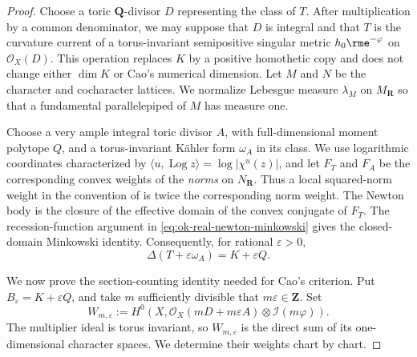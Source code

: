 \begin{proof}
Choose a toric $\mathbf Q$-divisor $D$ representing the class of $T$.
After multiplication by a common denominator, we may suppose that $D$ is
integral and that $T$ is the curvature current of a torus-invariant
semipositive singular metric $h_0\rme^{-\varphi}$ on
$\mathcal O_X(D)$.  This operation replaces $K$ by a positive homothetic
copy and does not change either $\dim K$ or Cao's numerical dimension.  Let
$M$ and $N$ be the character and cocharacter lattices.  We normalize
Lebesgue measure $\lambda_M$ on $M_{\mathbf R}$ so that a fundamental
parallelepiped of $M$ has measure one.

Choose a very ample integral toric divisor $A$, with full-dimensional
moment polytope $Q$, and a torus-invariant K\"ahler form $\omega_A$ in
its class.  We use logarithmic coordinates characterized by
$\langle u,\operatorname{Log}z\rangle=\log|\chi^u(z)|$, and let
$F_T$ and $F_A$
be the corresponding convex weights of the \emph{norms} on
$N_{\mathbf R}$.  Thus a local squared-norm weight in the convention of
 is twice the corresponding norm weight.  The
Newton body is the closure of the effective domain of the convex conjugate
of $F_T$.  The recession-function argument in
\eqref{eq:ok-real-newton-minkowski} gives the closed-domain Minkowski
identity.  Consequently, for rational $\varepsilon>0$,
\[
                  \Delta(T+\varepsilon\omega_A)=K+\varepsilon Q.
\tag{55.60}\label{eq:ok-toric-minkowski}
\]

We now prove the section-counting identity needed for Cao's criterion.  Put
$B_\varepsilon=K+\varepsilon Q$, and take $m$ sufficiently divisible that
$m\varepsilon\in\mathbf Z$.  Set
\[
 W_{m,\varepsilon}:=
 H^0\!\left(X,\mathcal O_X(mD+m\varepsilon A)
                 \otimes\mathcal I(m\varphi)\right).
\]
The multiplier ideal is torus invariant, so $W_{m,\varepsilon}$ is the
direct sum of its one-dimensional character spaces.  We determine their
weights chart by chart.


\end{proof}
